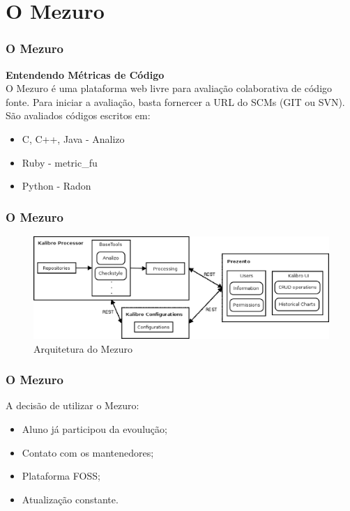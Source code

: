 \documentclass{beamer}
\begin{document}
\section{O Mezuro} %

\begin{frame}
\frametitle{O Mezuro}

\center
\textbf{Entendendo Métricas de Código} \\
O Mezuro é uma plataforma web livre para avaliação colaborativa de código fonte. Para iniciar a avaliação, basta fornercer a URL do SCMs (GIT ou SVN). São avaliados códigos escritos em:
\begin{itemize}
\item C, C++, Java - Analizo
\item Ruby - metric\_fu
\item Python - Radon
\end{itemize}

\end{frame}


\begin{frame}
\frametitle{O Mezuro}

\begin{figure}[!htb]
  \centering
    \includegraphics[keepaspectratio=true,scale=0.4]
    {../figuras/mezuroCloudArch.eps}
  \caption{Arquitetura do Mezuro \cite{camarinhaOSS2015}}
  \label{fig:parallel}
\end{figure}

\end{frame}


\begin{frame}
\frametitle{O Mezuro}

A decisão de utilizar o Mezuro:
\begin{itemize}
\item Aluno já participou da evoulução;
\item Contato com os mantenedores;
\item Plataforma FOSS;
\item Atualização constante.
\end{itemize}

\end{frame}
\end{document}
